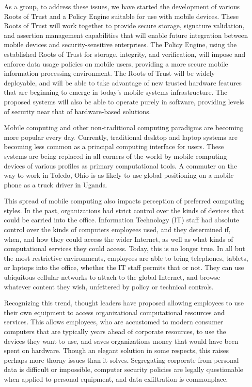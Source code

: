 \documentclass[10pt,letterpaper]{article}
\begin{document}
As a group, to address these issues, we have started the development of various Roots of Trust and a Policy Engine suitable for use with mobile devices. These Roots of Trust will work together to provide secure storage, signature validation, and assertion management capabilities that will enable future integration between mobile devices and security-sensitive enterprises. The Policy Engine, using the established Roots of Trust for storage, integrity, and verification, will impose and enforce data usage policies on mobile users, providing a more secure mobile information processing environment. The Roots of Trust will be widely deployable, and will be able to take advantage of new trusted hardware features that are beginning to emerge in today's mobile systems infrastructure. The proposed systems will also be able to operate purely in software, providing levels of security near that of hardware-based solutions.

Mobile computing and other non-traditional computing paradigms are becoming more popular every day. Currently, traditional desktop and laptop systems are becoming less common as a principal computing interface for users. These systems are being replaced in all corners of the world by mobile computing devices of various profiles as primary computational tools. A commuter on the way to work in Toledo, Ohio is as likely to use global positioning on a mobile phone as a truck driver in Uganda.

This spread of mobile computing also impacts perception of preferred computing styles. In the past, organizations had strict control over the kinds of devices that could be carried into the office. Information Technology (IT) staff had absolute control over the kinds of computers employees used, and they determined if, when, and how they could access the wider Internet, as well as what kinds of computational services they could access. Today, this is no longer true. In all but the most restrictive environments, employees are able to bring telephones, tablets, or laptops into the office, whether the IT staff permits that or not. They can use ubiquitous cellular networks to attach to the global Internet, and browse whatever content they wish, unfettered by policy or technical controls.

Recognizing this trend, thought leaders have proposed allowing employees to use their own equipment to access organizational computational resources and services. This allows employees, who are accustomed to modern consumer computers that are typically years ahead of corporate resources, to use the devices they want to use, and saves organizations money that would have been spent on hardware. Though an elegant solution in some respects, this raises perhaps more thorny issues than it solves. Segregating corporate from personal data is difficult or impossible, computer security policies are legally questionable when applied to personal equipment, and data exfiltration is commonplace. 
\end{document}
